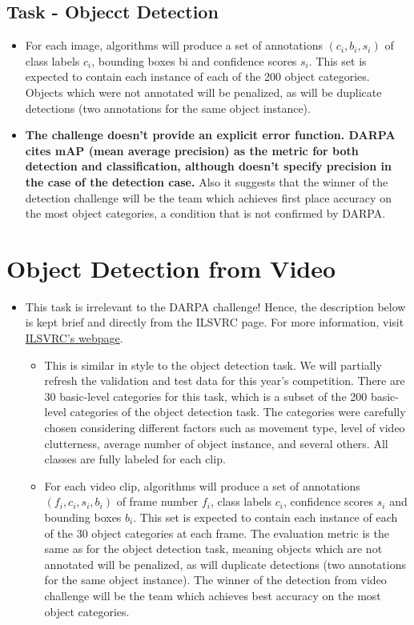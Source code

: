 \documentclass{article}
\begin{document}
\subsection{Task - Objecct Detection}
\begin{itemize}
    \item For each image, algorithms will produce a set of annotations $(c_i, b_i, s_i)$ of class labels $c_i$, bounding boxes bi and confidence scores $s_i$. This set is expected to contain each instance of each of the 200 object categories. Objects which were not annotated will be penalized, as will be duplicate detections (two annotations for the same object instance). 
    \item \textbf{The challenge doesn't provide an explicit error function. DARPA cites mAP (mean average precision) as the metric for both detection and classification, although doesn't specify precision in the case of the detection case.} Also it suggests that the winner of the detection challenge will be the team which achieves first place accuracy on the most object categories, a condition that is not confirmed by DARPA.
\end{itemize}

\section{Object Detection from Video}
\begin{itemize}
    \item This task is irrelevant to the DARPA challenge! Hence, the description below is kept brief and directly from the ILSVRC page. For more information, visit \href{http://image-net.org/challenges/LSVRC/2017/index#cite}{ILSVRC's webpage}.
    \begin{itemize}
        \item This is similar in style to the object detection task. We will partially refresh the validation and test data for this year's competition. There are 30 basic-level categories for this task, which is a subset of the 200 basic-level categories of the object detection task. The categories were carefully chosen considering different factors such as movement type, level of video clutterness, average number of object instance, and several others. All classes are fully labeled for each clip.
        \item For each video clip, algorithms will produce a set of annotations $(f_i,c_i,s_i,b_i)$ of frame number $f_i$, class labels $c_i$, confidence scores $s_i$ and bounding boxes $b_i$. This set is expected to contain each instance of each of the 30 object categories at each frame. The evaluation metric is the same as for the object detection task, meaning objects which are not annotated will be penalized, as will duplicate detections (two annotations for the same object instance). The winner of the detection from video challenge will be the team which achieves best accuracy on the most object categories.
    \end{itemize}
\end{itemize}
    


\end{document}
